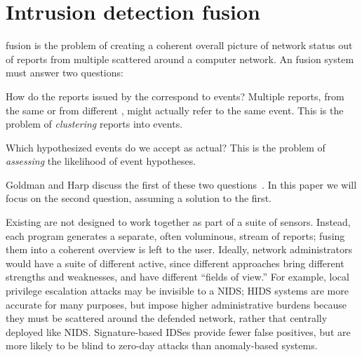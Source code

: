 \section{Intrusion detection fusion}
\label{sec:ids-fusion}
{\ids} fusion %
is the
problem of creating a
coherent overall picture of network status out of reports from multiple
{\idses} scattered around a computer network. %
An \ids fusion system must answer two questions:
\begin{compactenum}
\item How do the reports issued by the \idses correspond to events? Multiple
  reports, from the same \ids or from different \idses,  might
  actually refer to the same event. This is the problem of \emph{clustering}
  reports into events.
\item Which hypothesized events do we accept as actual?  This is the problem of
  \emph{assessing} the likelihood of event hypotheses.
\end{compactenum}
Goldman and Harp discuss the first of these two
questions~.  In this paper we will
focus on the second question, assuming a solution to the first.

Existing \idses are not designed to work together as part of a
suite of sensors.  Instead, each program generates a separate,
often voluminous, stream of reports; fusing them into a coherent 
overview is left
 to
the user. 
Ideally, network administrators would have a suite of different \idses active,
since different \ids approaches
bring different
strengths and weaknesses, and have different ``fields of view.'' For example, local
privilege escalation attacks may be invisible to a NIDS; HIDS systems are more
accurate for many purposes, but impose higher administrative burdens because
they must be scattered around the defended network, rather that centrally
deployed like NIDS.  Signature-based IDSes provide fewer false positives, but
are more likely to be blind to zero-day attacks than anomaly-based systems.


